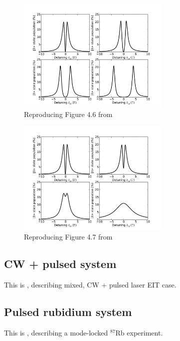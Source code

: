 \documentclass{article}
\begin{document}
\begin{spacing}{1.1}
\begin{figure}
\begin{center}
\includegraphics[width=0.65\textwidth]{figures/matt46.pdf}
\caption{Reproducing Figure 4.6 from \cite{McDonnell2003}}
\label{fig:matt43}
\end{center}
\end{figure}

\begin{figure}
\begin{center}
\includegraphics[width=0.65\textwidth]{figures/matt47.pdf}
\caption{Reproducing Figure 4.7 from \cite{McDonnell2003}}
\label{fig:matt43}
\end{center}
\end{figure}

\subsection{CW + pulsed system}
This is \cite{Soares2010}, describing mixed, CW + pulsed laser EIT case.

\subsection{Pulsed rubidium system}
This is \cite{Arissian2006}, describing a mode-locked $^{87}$Rb experiment.



\end{spacing}
\end{document}
